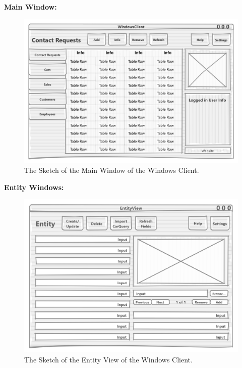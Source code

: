 \textbf{Main Window:}
\begin{figure}[H]
	\centering
	\includegraphics[scale=0.25]{Figures/UserInterface/WindowsMain}
	\caption{The Sketch of the Main Window of the Windows Client.}
	\label{fig:UserInterfaceWindowsMain}
\end{figure}
\textbf{Entity Windows:}
\begin{figure}[H]
	\centering
	\includegraphics[scale=0.30]{Figures/UserInterface/EntityView}
	\caption{The Sketch of the Entity View of the Windows Client.}
	\label{fig:UserInterfaceEntityWindow}
\end{figure}
